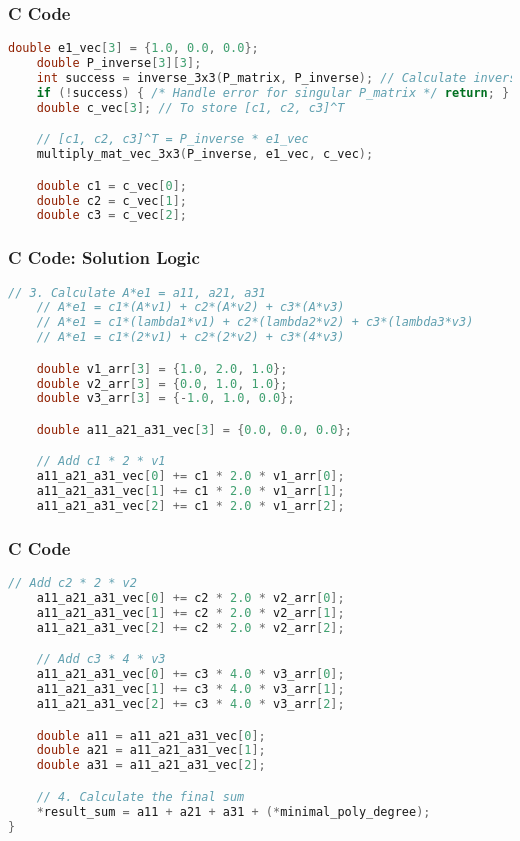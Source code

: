 \documentclass{beamer}
\begin{document}
\begin{frame}[fragile]
\frametitle{C Code}
\begin{lstlisting}[language=C]
    double e1_vec[3] = {1.0, 0.0, 0.0};
    double P_inverse[3][3];
    int success = inverse_3x3(P_matrix, P_inverse); // Calculate inverse
    if (!success) { /* Handle error for singular P_matrix */ return; }
    double c_vec[3]; // To store [c1, c2, c3]^T

    // [c1, c2, c3]^T = P_inverse * e1_vec
    multiply_mat_vec_3x3(P_inverse, e1_vec, c_vec);

    double c1 = c_vec[0];
    double c2 = c_vec[1];
    double c3 = c_vec[2];
\end{lstlisting}
\end{frame}

\begin{frame}[fragile]
\frametitle{C Code: Solution Logic}
\begin{lstlisting}[language=C]
    // 3. Calculate A*e1 = a11, a21, a31
    // A*e1 = c1*(A*v1) + c2*(A*v2) + c3*(A*v3)
    // A*e1 = c1*(lambda1*v1) + c2*(lambda2*v2) + c3*(lambda3*v3)
    // A*e1 = c1*(2*v1) + c2*(2*v2) + c3*(4*v3)

    double v1_arr[3] = {1.0, 2.0, 1.0};
    double v2_arr[3] = {0.0, 1.0, 1.0};
    double v3_arr[3] = {-1.0, 1.0, 0.0};

    double a11_a21_a31_vec[3] = {0.0, 0.0, 0.0};

    // Add c1 * 2 * v1
    a11_a21_a31_vec[0] += c1 * 2.0 * v1_arr[0];
    a11_a21_a31_vec[1] += c1 * 2.0 * v1_arr[1];
    a11_a21_a31_vec[2] += c1 * 2.0 * v1_arr[2];
\end{lstlisting}
\end{frame}

\begin{frame}[fragile]
\frametitle{C Code}
\begin{lstlisting}[language=C]
    // Add c2 * 2 * v2
    a11_a21_a31_vec[0] += c2 * 2.0 * v2_arr[0];
    a11_a21_a31_vec[1] += c2 * 2.0 * v2_arr[1];
    a11_a21_a31_vec[2] += c2 * 2.0 * v2_arr[2];

    // Add c3 * 4 * v3
    a11_a21_a31_vec[0] += c3 * 4.0 * v3_arr[0];
    a11_a21_a31_vec[1] += c3 * 4.0 * v3_arr[1];
    a11_a21_a31_vec[2] += c3 * 4.0 * v3_arr[2];

    double a11 = a11_a21_a31_vec[0];
    double a21 = a11_a21_a31_vec[1];
    double a31 = a11_a21_a31_vec[2];

    // 4. Calculate the final sum
    *result_sum = a11 + a21 + a31 + (*minimal_poly_degree);
}
\end{lstlisting}
\end{frame}
\end{document}

